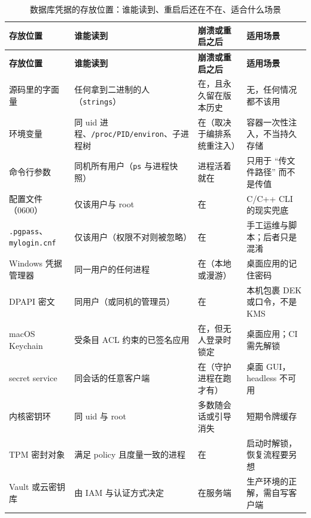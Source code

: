 \documentclass[12pt,a4paper,fontset=fandol]{ctexbook}
\newcommand{\Tp}[1]{\texttt{#1}}
\newcommand{\CppJava}{C/C++}
\begin{document}
\begin{scriptsize}
\setlength{\tabcolsep}{3pt}
\begin{longtable}{@{}>{\raggedright\arraybackslash}p{}
                  >{\raggedright\arraybackslash}p{}
                  >{\raggedright\arraybackslash}p{}
                  >{\raggedright\arraybackslash}p{}@{}}
\caption{数据库凭据的存放位置：谁能读到、重启后还在不在、适合什么场景} \\
\toprule
\textbf{存放位置} & \textbf{谁能读到} & \textbf{崩溃或重启之后} &
\textbf{适用场景} \\
\midrule
\endfirsthead
\toprule
\textbf{存放位置} & \textbf{谁能读到} & \textbf{崩溃或重启之后} &
\textbf{适用场景} \\
\midrule
\endhead
\bottomrule
\endfoot
源码里的字面量 & 任何拿到二进制的人（\texttt{strings}） & 在，且永久留在版本历史 & 无，任何情况都不该用 \\
\addlinespace
环境变量 & 同 uid 进程、\Tp{/proc/PID/\allowbreak{}\allowbreak environ}、子进程树 & 在（取决于编排系统重注入） & 容器一次性注入，不当持久存储 \\
\addlinespace
命令行参数 & 同机所有用户（\texttt{ps} 与进程快照） & 进程活着就在 & 只用于 ``传文件路径'' 而不是传值 \\
\addlinespace
配置文件（0600） & 仅该用户与 root & 在 & \CppJava{} CLI 的现实兜底 \\
\addlinespace
\Tp{.pgpass}、\Tp{mylogin.cnf} & 仅该用户（权限不对则被忽略） & 在 & 手工运维与脚本；后者只是混淆 \\
\addlinespace
Windows 凭据管理器 & 同一用户的任何进程 & 在（本地或漫游） & 桌面应用的记住密码 \\
\addlinespace
DPAPI 密文 & 同用户（或同机的管理员） & 在 & 本机包裹 DEK 或口令，不是 KMS \\
\addlinespace
macOS Keychain & 受条目 ACL 约束的已签名应用 & 在，但无人登录时锁定 & 桌面应用；CI 需先解锁 \\
\addlinespace
secret service & 同会话的任意客户端 & 在（守护进程在跑才有） & 桌面 GUI，headless 不可用 \\
\addlinespace
内核密钥环 & 同 uid 与 root & 多数随会话或引导消失 & 短期令牌缓存 \\
\addlinespace
TPM 密封对象 & 满足 policy 且度量一致的进程 & 在 & 启动时解锁，恢复流程要另想 \\
\addlinespace
Vault 或云密钥库 & 由 IAM 与认证方式决定 & 在服务端 & 生产环境的正解，需自写客户端 \\
\end{longtable}
\setlength{\tabcolsep}{6pt}
\end{scriptsize}
\end{document}
